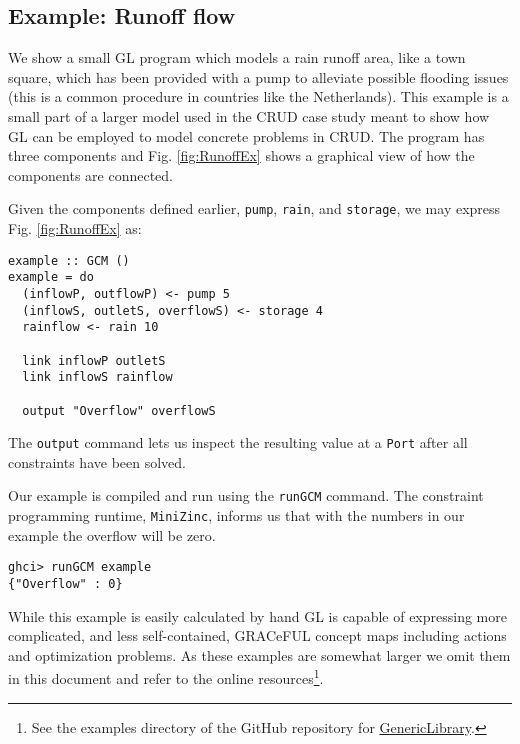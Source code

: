 \subsection{Example: Runoff flow}
\label{example-runoff-flow}

We show a small GL program which models a rain runoff area, like a
town square, which has been provided with a pump to alleviate possible
flooding issues (this is a common procedure in countries like the
Netherlands).
%
This example is a small part of a larger model used in the CRUD case
study meant to show how GL can be employed to model concrete problems
in CRUD.
%
The program has three components and Fig. \ref{fig:RunoffEx} shows a
graphical view of how the components are connected.
%

Given the components defined earlier, \texttt{pump}, \texttt{rain}, and \texttt{storage},
we may express Fig. \ref{fig:RunoffEx} as:
\begin{verbatim}
example :: GCM ()
example = do
  (inflowP, outflowP) <- pump 5
  (inflowS, outletS, overflowS) <- storage 4
  rainflow <- rain 10

  link inflowP outletS
  link inflowS rainflow

  output "Overflow" overflowS
\end{verbatim}
The \texttt{output} command lets us inspect the resulting value at a \texttt{Port}
after all constraints have been solved.

Our example is compiled and run using the \texttt{runGCM} command.
%
The constraint programming runtime, \texttt{MiniZinc}, informs us
that with the numbers in our example the overflow will be zero.

\begin{verbatim}
ghci> runGCM example
{"Overflow" : 0}
\end{verbatim}

While this example is easily calculated by hand GL is capable of
expressing more complicated, and less self-contained, GRACeFUL concept
maps including actions and optimization problems.
%
As these examples are somewhat larger we omit them in this document
and refer to the online resources\footnote{See the examples directory
  of the GitHub repository for
  \href{https://github.com/GRACeFUL-project/GenericLibrary}{GenericLibrary}.}.

